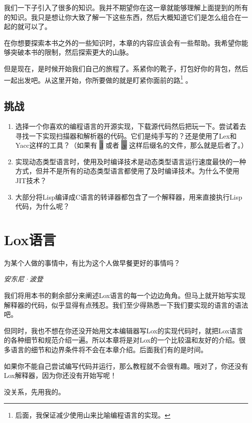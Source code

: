 \documentclass[cn,10pt,math=newtx,citestyle=gb7714-2015,bibstyle=gb7714-2015]{elegantbook}
\begin{document}
我们一下子引入了很多的知识。我并不期望你在这一章就能够理解上面提到的所有的知识。我只是想让你大致了解一下这些东西，然后大概知道它们是怎么组合在一起的就可以了。

在你想要探索本书之外的一些知识时，本章的内容应该会有一些帮助。我希望你能够突破本书的限制，然后探索更大的山脉。

但是现在，是时候开始我们自己的旅程了。系紧你的靴子，打包好你的背包，然后一起出发吧。从这里开始，你所要做的就是盯紧你面前的路\footnote{后面，我保证减少使用山来比喻编程语言的实现。} 。

\section{挑战}

\begin{enumerate}
   \item 选择一个你喜欢的编程语言的开源实现，下载源代码然后把玩一下。尝试着去寻找一下实现扫描器和解析器的代码。它们是纯手写的？还是使用了Lex和Yacc这样的工具？（如果有 \colorbox{gray}{.l} 或者 \colorbox{gray}{.y} 这样后缀名的文件，那么就是后者了。）
   \item 实现动态类型语言时，使用及时编译技术是动态类型语言运行速度最快的一种方式，但并不是所有的动态类型语言都使用了及时编译技术。为什么不使用JIT技术？
   \item 大部分将Lisp编译成C语言的转译器都包含了一个解释器，用来直接执行Lisp代码，为什么呢？
\end{enumerate}

\chapter{Lox语言}

\epigraph{为某个人做的事情中，有比为这个人做早餐更好的事情吗？}{\textit{安东尼·波登}}

我们将用本书的剩余部分来阐述Lox语言的每一个边边角角。但马上就开始写实现解释器的代码，似乎显得有点残忍。我们至少得熟悉一下我们要实现的语言的语法吧。

但同时，我也不想在你还没开始用文本编辑器写Lox的实现代码时，就把Lox语言的各种细节和规范介绍一遍。所以本章将是对Lox的一个比较温和友好的介绍。很多语言的细节和边界条件将不会在本章介绍。后面我们有的是时间。

\begin{tcolorbox}
如果你不能自己尝试编写代码并运行，那么教程就不会很有趣。哦对了，你还没有Lox解释器，因为你还没有开始写呢！

没关系，先用我的。
\end{tcolorbox}
\end{document}
